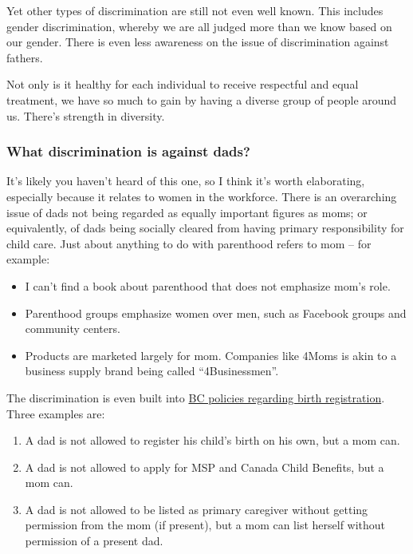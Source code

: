 \documentclass[]{article}
\providecommand{\tightlist}{%
  \setlength{\itemsep}{0pt}\setlength{\parskip}{0pt}}
\begin{document}
Yet other types of discrimination are still not even well known. This includes gender discrimination, whereby we are all judged more than we know based on our gender. There is even less awareness on the issue of discrimination against fathers.

Not only is it healthy for each individual to receive respectful and equal treatment, we have so much to gain by having a diverse group of people around us. There's strength in diversity.

\hypertarget{what-discrimination-is-against-dads}{%
\subsubsection{What discrimination is against dads?}\label{what-discrimination-is-against-dads}}

It's likely you haven't heard of this one, so I think it's worth elaborating, especially because it relates to women in the workforce. There is an overarching issue of dads not being regarded as equally important figures as moms; or equivalently, of dads being socially cleared from having primary responsibility for child care. Just about anything to do with parenthood refers to mom -- for example:

\begin{itemize}
\tightlist
\item
  I can't find a book about parenthood that does not emphasize mom's role.
\item
  Parenthood groups emphasize women over men, such as Facebook groups and community centers.
\item
  Products are marketed largely for mom. Companies like 4Moms is akin to a business supply brand being called ``4Businessmen''.
\end{itemize}

The discrimination is even built into \href{https://www2.gov.bc.ca/gov/content/life-events/birth-adoption/births/birth-registration}{BC policies regarding birth registration}. Three examples are:

\begin{enumerate}
\def\labelenumi{\arabic{enumi}.}
\tightlist
\item
  A dad is not allowed to register his child's birth on his own, but a mom can.
\item
  A dad is not allowed to apply for MSP and Canada Child Benefits, but a mom can.
\item
  A dad is not allowed to be listed as primary caregiver without getting permission from the mom (if present), but a mom can list herself without permission of a present dad.
\end{enumerate}
\end{document}
